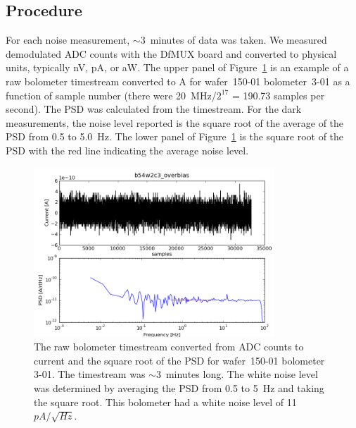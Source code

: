 \subsection{Procedure}
\label{sec:procedure}

For each noise measurement, $\sim$3~minutes of data was taken. 
We measured demodulated \ac{ADC} counts with the \ac{DfMUX} board and converted to physical units, typically nV, pA, or aW. 
The upper panel of Figure~\ref{fig:timestream_and_psd} is an example of a raw bolometer timestream converted to A for wafer~150-01 bolometer~3-01 as a function of sample number (there were 20~MHz/$2^{17}$ = 190.73 samples per second).
The \ac{PSD} was calculated from the timestream. 
For the dark measurements, the noise level reported is the square root of the average of the \ac{PSD} from 0.5 to 5.0~Hz. 
The lower panel of Figure~\ref{fig:timestream_and_psd} is the square root of the PSD with the red line indicating the average noise level. 

\begin{figure}[ht!]
\begin{center}
\includegraphics[height=2.5in]{figures/b54w2c3_overbias.png}
\caption{The raw bolometer timestream converted from \ac{ADC} counts to current and the square root of the PSD for wafer~150-01 bolometer 3-01. The timestream was $\sim$3~minutes long. The white noise level was determined by averaging the \ac{PSD} from 0.5 to 5~Hz and taking the square root. This bolometer had a white noise level of 11~$pA/\sqrt{Hz}$. 
\label{fig:timestream_and_psd} }
\end{center}
\end{figure}



